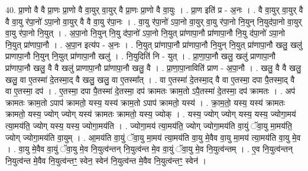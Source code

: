 \documentclass[17pt]{extarticle}
\begin{document}
40. प्रा॒णो वै वै प्रा॒णः प्रा॒णो वै वा॒युर् वा॒युर् वै प्रा॒णः प्रा॒णो वै वा॒युः । . प्रा॒ण इति॑ प्र - अ॒नः । . वै वा॒युर् वा॒युर् वै वै वा॒यु र॑पा॒नो॑ ऽपा॒नो वा॒युर् वै वै वा॒यु र॑पा॒नः । . वा॒यु र॑पा॒नो॑ ऽपा॒नो वा॒युर् वा॒यु र॑पा॒नो नि॒युन् नि॒युद॑पा॒नो वा॒युर् वा॒यु र॑पा॒नो नि॒युत् । . अ॒पा॒नो नि॒युन् नि॒यु द॑पा॒नो॑ ऽपा॒नो नि॒युत् प्रा॑णापा॒नौ प्रा॑णापा॒नौ नि॒यु द॑पा॒नो॑ ऽपा॒नो नि॒युत् प्रा॑णापा॒नौ । . अ॒पा॒न इत्य॑प - अ॒नः । . नि॒युत् प्रा॑णापा॒नौ प्रा॑णापा॒नौ नि॒युन् नि॒युत् प्रा॑णापा॒नौ खलु॒ खलु॑ प्राणापा॒नौ नि॒युन् नि॒युत् प्रा॑णापा॒नौ खलु॑ । . नि॒युदिति॑ नि - युत् । . प्रा॒णा॒पा॒नौ खलु॒ खलु॑ प्राणापा॒नौ प्रा॑णापा॒नौ खलु॒ वै वै खलु॑ प्राणापा॒नौ प्रा॑णापा॒नौ खलु॒ वै । . प्रा॒णा॒पा॒नाविति॑ प्राण - अ॒पा॒नौ । . खलु॒ वै वै खलु॒ खलु॒ वा ए॒तस्मा॑ दे॒तस्मा॒द् वै खलु॒ खलु॒ वा ए॒तस्मा᳚त् । . वा ए॒तस्मा॑ दे॒तस्मा॒द् वै वा ए॒तस्मा॒ दपा पै॒तस्मा॒द् वै वा ए॒तस्मा॒ दप॑ । . ए॒तस्मा॒ दपा पै॒तस्मा॑ दे॒तस्मा॒ दप॑ क्रामतः क्राम॒तो ऽपै॒तस्मा॑ दे॒तस्मा॒ दप॑ क्रामतः । . अप॑ क्रामतः क्राम॒तो ऽपाप॑ क्रामतो॒ यस्य॒ यस्य॑ क्राम॒तो ऽपाप॑ क्रामतो॒ यस्य॑ । . क्रा॒म॒तो॒ यस्य॒ यस्य॑ क्रामतः क्रामतो॒ यस्य॒ ज्योग् ज्योग् यस्य॑ क्रामतः क्रामतो॒ यस्य॒ ज्योक् । . यस्य॒ ज्योग् ज्योग् यस्य॒ यस्य॒ ज्योगा॒मय॑ त्या॒मय॑ति॒ ज्योग् यस्य॒ यस्य॒ ज्योगा॒मय॑ति । . ज्योगा॒मय॑ त्या॒मय॑ति॒ ज्योग् ज्योगा॒मय॑ति वा॒युं ॅवा॒यु मा॒मय॑ति॒ ज्योग् ज्योगा॒मय॑ति वा॒युम् । . आ॒मय॑ति वा॒युं ॅवा॒यु मा॒मय॑ त्या॒मय॑ति वा॒यु मे॒वैव वा॒यु मा॒मय॑ त्या॒मय॑ति वा॒यु मे॒व । . वा॒यु मे॒वैव वा॒युं ॅवा॒यु मे॒व नि॒युत्व॑न्तन् नि॒युत्व॑न्त मे॒व वा॒युं ॅवा॒यु मे॒व नि॒युत्व॑न्तम् । . ए॒व नि॒युत्व॑न्तन् नि॒युत्व॑न्त मे॒वैव नि॒युत्व॑न्तꣳ॒॒ स्वेन॒ स्वेन॑ नि॒युत्व॑न्त मे॒वैव नि॒युत्व॑न्तꣳ॒॒ स्वेन॑ । \newline
\end{document}
